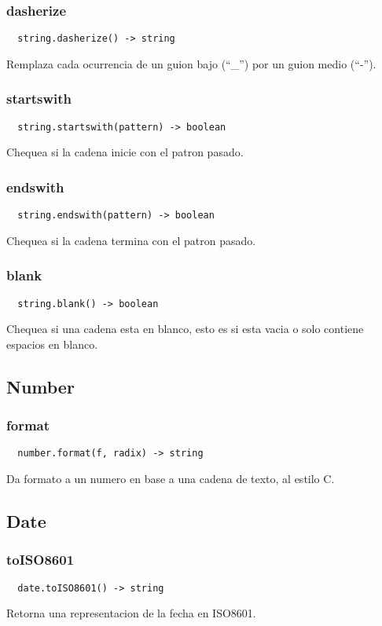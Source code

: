 \subsubsection*{dasherize}
\begin{verbatim}
  string.dasherize() -> string
\end{verbatim}
Remplaza cada ocurrencia de un guion bajo (``\_'') por un guion medio (``-'').

\subsubsection*{startswith}
\begin{verbatim}
  string.startswith(pattern) -> boolean
\end{verbatim}
Chequea si la cadena inicie con el patron pasado.

\subsubsection*{endswith}
\begin{verbatim}
  string.endswith(pattern) -> boolean
\end{verbatim}
Chequea si la cadena termina con el patron pasado.

\subsubsection*{blank}
\begin{verbatim}
  string.blank() -> boolean
\end{verbatim}
Chequea si una cadena esta en blanco, esto es si esta vacia o solo contiene
espacios en blanco.

\subsection{Number}
\subsubsection*{format}
\begin{verbatim}
  number.format(f, radix) -> string
\end{verbatim}
Da formato a un numero en base a una cadena de texto, al estilo C.

\subsection{Date}
\subsubsection*{toISO8601}
\begin{verbatim}
  date.toISO8601() -> string
\end{verbatim}
Retorna una representacion de la fecha en ISO8601.

